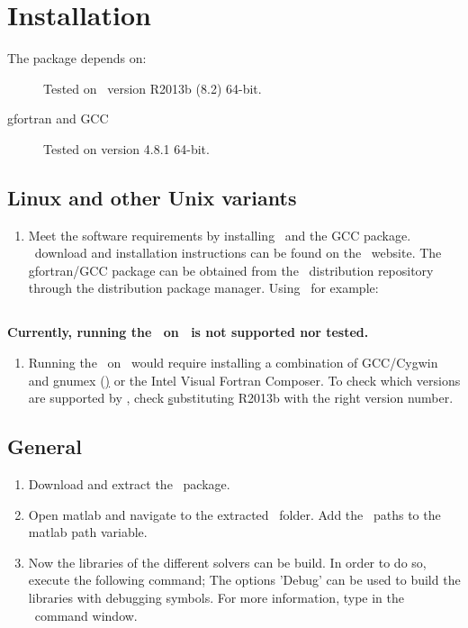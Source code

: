 \chapter[Installation]{Installation} \label{ch:Installation}
The \PPODESUITE package depends on:
\begin{description}
  \item[\MATLAB] Tested on \MATLAB~version R2013b (8.2) 64-bit.
  \item[gfortran and GCC] Tested on version 4.8.1 64-bit.
\end{description}

\section[\nix]{Linux and other Unix variants}
\begin{enumerate}
 \item Meet the software requirements by installing \MATLAB~and the GCC package. \MATLAB~download and installation instructions can be found on the \MATHWORKS~website. The gfortran/GCC package can be obtained from the \nix~distribution repository through the distribution package manager. Using \UBUNTU~for example:
\end{enumerate}

\section[Windows]{\MSDOS}
\textbf{Currently, running the \PPODESUITE~on \MSDOS~is not supported nor tested.}
\begin{enumerate}
 \item Running the \PPODESUITE~on \MSDOS~would require installing a combination of GCC/Cygwin and gnumex (\hyperlink{http://gnumex.sourceforge.net/}) or the Intel Visual Fortran Composer. To check which versions are supported by \MATLAB, check \hyperlink{http://www.mathworks.nl/support/compilers/R2013b/} substituting R2013b with the right version number.
\end{enumerate}

\section{General}
\begin{enumerate}[resume]
 \item Download and extract the \PPODESUITE~package.
 \item Open matlab and navigate to the extracted \PPODESUITE~folder. Add the \PPODE~paths to the matlab path variable.
 \item Now the libraries of the different solvers can be build. In order to do so, execute the following command;
 The options 'Debug' can be used to build the libraries with debugging symbols.
 For more information, type  in the \MATLAB~command window.
\end{enumerate}
